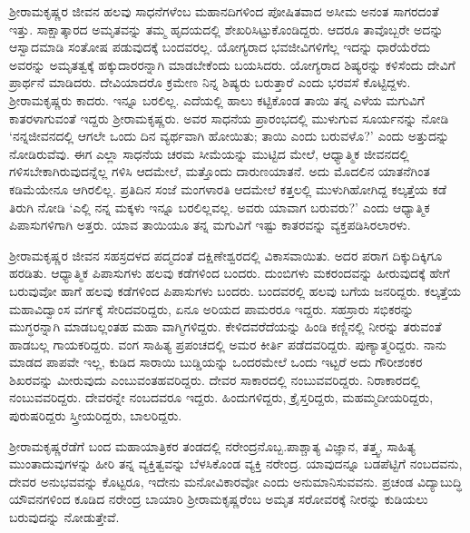 ಶ‍್ರೀರಾಮಕೃಷ್ಣರ ಜೀವನ ಹಲವು ಸಾಧನೆಗಳೆಂಬ ಮಹಾನದಿಗಳಿಂದ ಪೋಷಿತವಾದ ಅಸೀಮ ಅನಂತ ಸಾಗರದಂತೆ ಇತ್ತು. ಸಾಕ್ಷಾತ್ಕಾರದ ಅಮೃತವನ್ನು ತಮ್ಮ ಹೃದಯದಲ್ಲಿ ಶೇಖರಿಸಿಟ್ಟುಕೊಂಡಿದ್ದರು. ಆದರೂ ತಾವೊಬ್ಬರೇ ಅದನ್ನು ಆಸ್ವಾದಮಾಡಿ ಸಂತೋಷ ಪಡುವುದಕ್ಕೆ ಬಂದವರಲ್ಲ. ಯೋಗ್ಯರಾದ ಭವಜೀವಿಗಳಿಗೆಲ್ಲ ಇದನ್ನು ಧಾರೆಯೆರೆದು ಅವರನ್ನು ಅಮೃತತ್ವಕ್ಕೆ ಹಕ್ಕುದಾರರನ್ನಾಗಿ ಮಾಡಬೇಕೆಂದು ಬಯಸಿದರು. ಯೋಗ್ಯರಾದ ಶಿಷ್ಯರನ್ನು ಕಳಿಸೆಂದು ದೇವಿಗೆ ಪ್ರಾರ್ಥನೆ ಮಾಡಿದರು. ದೇವಿಯಾದರೊ ಕ್ರಮೇಣ ನಿನ್ನ ಶಿಷ್ಯರು ಬರುತ್ತಾರೆ ಎಂದು ಭರವಸೆ ಕೊಟ್ಟಿದ್ದಳು. ಶ‍್ರೀರಾಮಕೃಷ್ಣರು ಕಾದರು. ಇನ್ನೂ ಬರಲಿಲ್ಲ. ಎದೆಯಲ್ಲಿ ಹಾಲು ಕಟ್ಟಿಕೊಂಡ ತಾಯಿ ತನ್ನ ಎಳೆಯ ಮಗುವಿಗೆ ಕಾತರಳಾಗುವಂತೆ ಇದ್ದರು ಶ‍್ರೀರಾಮಕೃಷ್ಣರು. ಅವರ ಸಾಧನೆಯ ಪ್ರಾರಂಭದಲ್ಲಿ ಮುಳುಗುವ ಸೂರ್ಯನನ್ನು ನೋಡಿ ‘ನನ್ನ\break ಜೀವನದಲ್ಲಿ ಆಗಲೇ ಒಂದು ದಿನ ವ್ಯರ್ಥವಾಗಿ ಹೋಯಿತು; ತಾಯಿ ಎಂದು ಬರುವಳೊ?’ ಎಂದು ಅತ್ತುದನ್ನು ನೋಡಿರುವೆವು. ಈಗ ಎಲ್ಲಾ ಸಾಧನೆಯ ಚರಮ ಸೀಮೆಯನ್ನು ಮುಟ್ಟಿದ ಮೇಲೆ, ಆಧ್ಯಾತ್ಮಿಕ ಜೀವನದಲ್ಲಿ ಗಳಿಸಬೇಕಾಗಿರುವುದನ್ನೆಲ್ಲ ಗಳಿಸಿ ಆದಮೇಲೆ, ಮತ್ತೊಂದು ದಾರುಣಯಾತನೆ. ಅದು ಮೊದಲಿನ ಯಾತನೆಗಿಂತ ಕಡಿಮೆಯೇನೂ ಆಗಿರಲಿಲ್ಲ. ಪ್ರತಿದಿನ ಸಂಜೆ ಮಂಗಳಾರತಿ ಆದಮೇಲೆ ಕತ್ತಲಲ್ಲಿ ಮುಳುಗಿಹೋಗಿದ್ದ ಕಲ್ಕತ್ತೆಯ ಕಡೆ ತಿರುಗಿ ನೋಡಿ ‘ಎಲ್ಲಿ ನನ್ನ ಮಕ್ಕಳು ಇನ್ನೂ ಬರಲಿಲ್ಲವಲ್ಲ. ಅವರು ಯಾವಾಗ ಬರುವರು?’ ಎಂದು ಆಧ್ಯಾತ್ಮಿಕ ಪಿಪಾಸುಗಳಿಗಾಗಿ ಅತ್ತರು. ಯಾವ ತಾಯಿಯೂ ತನ್ನ ಮಗುವಿಗೆ ಇಷ್ಟು ಕಾತರವನ್ನು ವ್ಯಕ್ತಪಡಿಸಿರಲಾರಳು.

ಶ‍್ರೀರಾಮಕೃಷ್ಣರ ಜೀವನ ಸಹಸ್ರದಳದ ಪದ್ಮದಂತೆ ದಕ್ಷಿಣೇಶ್ವರದಲ್ಲಿ ವಿಕಾಸವಾಯಿತು. ಅದರ ಪರಾಗ ದಿಕ್ಕುದಿಕ್ಕಿಗೂ ಹರಡಿತು. ಆಧ್ಯಾತ್ಮಿಕ ಪಿಪಾಸುಗಳು ಹಲವು ಕಡೆಗಳಿಂದ ಬಂದರು. ದುಂಬಿಗಳು ಮಕರಂದವನ್ನು ಹೀರುವುದಕ್ಕೆ ಹೇಗೆ ಬರುವುವೋ ಹಾಗೆ ಹಲವು ಕಡೆಗಳಿಂದ ಪಿಪಾಸುಗಳು ಬಂದರು. ಬಂದವರಲ್ಲಿ ಹಲವು ಬಗೆಯ ಜನರಿದ್ದರು. ಕಲ್ಕತ್ತೆಯ ಮಹಾವಿದ್ವಾಂಸ ವರ್ಗಕ್ಕೆ ಸೇರಿದವರಿದ್ದರು, ಏನೂ ಅರಿಯದ ಪಾಮರರೂ ಇದ್ದರು. ಸಹಸ್ರಾರು ಸಭಿಕರನ್ನು ಮುಗ್ಧರನ್ನಾಗಿ ಮಾಡಬಲ್ಲಂತಹ ಮಹಾ ವಾಗ್ಮಿಗಳಿದ್ದರು. ಕೇಳಿದವರೆದೆಯನ್ನು ಹಿಂಡಿ ಕಣ್ಣಿನಲ್ಲಿ ನೀರನ್ನು ತರುವಂತೆ ಹಾಡಬಲ್ಲ ಗಾಯಕರಿದ್ದರು. ವಂಗ ಸಾಹಿತ್ಯ ಪ್ರಪಂಚದಲ್ಲಿ ಅಮರ ಕೀರ್ತಿ ಪಡೆದವರಿದ್ದರು. ಪುಣ್ಯಾತ್ಮರಿದ್ದರು. ನಾನು ಮಾಡದ ಪಾಪವೇ ಇಲ್ಲ, ಕುಡಿದ ಸಾರಾಯಿ ಬುಡ್ಡಿಯನ್ನು ಒಂದರಮೇಲೆ ಒಂದು ಇಟ್ಟರೆ ಅದು ಗೌರೀಶಂಕರ ಶಿಖರವನ್ನು ಮೀರುವುದು ಎಂಬುವಂತಹವರಿದ್ದರು. ದೇವರ ಸಾಕಾರದಲ್ಲಿ ನಂಬುವವರಿದ್ದರು. ನಿರಾಕಾರದಲ್ಲಿ ನಂಬುವವರಿದ್ದರು. ದೇವರನ್ನೇ ನಂಬದವರೂ ಇದ್ದರು. ಹಿಂದುಗಳಿದ್ದರು, ಕ್ರೈಸ್ತರಿದ್ದರು, ಮಹಮ್ಮದೀಯರಿದ್ದರು, ಪುರುಷರಿದ್ದರು ಸ್ತ್ರೀಯರಿದ್ದರು, ಬಾಲರಿದ್ದರು.

ಶ‍್ರೀರಾಮಕೃಷ್ಣರೆಡೆಗೆ ಬಂದ ಮಹಾಯಾತ್ರಿಕರ ತಂಡದಲ್ಲಿ ನರೇಂದ್ರನೊಬ್ಬ.\break ಪಾಶ್ಚಾತ್ಯ ವಿಜ್ಞಾನ, ತತ್ತ್ವ, ಸಾಹಿತ್ಯ ಮುಂತಾದುವುಗಳನ್ನು ಹೀರಿ ತನ್ನ ವ್ಯಕ್ತಿತ್ವವನ್ನು ಬೆಳಸಿಕೊಂಡ ವ್ಯಕ್ತಿ ನರೇಂದ್ರ. ಯಾವುದನ್ನೂ ಬಡಪೆಟ್ಟಿಗೆ ನಂಬದವನು, ದೇವರ ಅನುಭವವನ್ನು ಕೊಟ್ಟರೂ, ಇದೇನು ಮನೋವಿಕಾರವೋ ಎಂದು ಅನುಮಾನಿಸುವವನು. ಪ್ರಚಂಡ ವಿದ್ಯಾಬುದ್ಧಿ ಯೌವನಗಳಿಂದ ಕೂಡಿದ ನರೇಂದ್ರ ಬಾಯಾರಿ ಶ‍್ರೀರಾಮಕೃಷ್ಣರೆಂಬ ಅಮೃತ ಸರೋವರಕ್ಕೆ ನೀರನ್ನು ಕುಡಿಯಲು ಬರುವುದನ್ನು ನೋಡುತ್ತೇವೆ.

